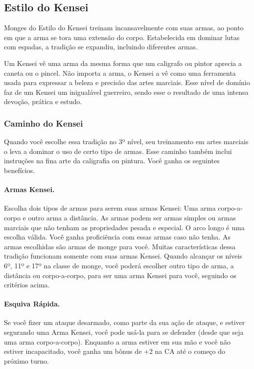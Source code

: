 \begin{multicols}{2}
\subsection*{Estilo do Kensei}%
\label{sub:estilo_do_kensei}

Monges do Estilo do Kensei treinam incansavelmente com suas armas, ao ponto em
que a arma se tora uma extensão do corpo. Estabelecida em dominar lutas com
espadas, a tradição se expandiu, incluindo diferentes armas.

Um Kensei vê uma arma da mesma forma que um caligrafo ou pintor aprecia a caneta
ou o pincel. Não importa a arma, o Kensei a vê como uma ferramenta usada para
expressar a beleza e precisão das artes marciais. Esse nível de domínio faz de
um Kensei um inigualável guerreiro, sendo esse o resultado de uma intensa
devoção, prática e estudo.

\subsubsection*{Caminho do Kensei}%
\label{ssub:caminho_do_kensei}

Quando você escolhe essa tradição no 3º nível, seu treinamento em artes marciais
o leva a dominar o uso de certo tipo de armas. Esse caminho também inclui
instruções na fina arte da caligrafia ou pintura. Você ganha os seguintes
benefícios.

\paragraph{Armas Kensei.}%
Escolha dois tipos de armas para serem suas armas Kensei: Uma arma corpo-a-corpo
e outro arma a distância. As armas podem ser armas simples ou armas marciais que
não tenham as propriedades pesada e especial. O arco longo é uma escolha válida.
Você ganha proficiência com essas armas caso não tenha. As armas escolhidas são
armas de monge para você. Muitas características dessa tradição funcionam
somente com suas armas Kensei. Quando alcançar os níveis 6º, 11º e 17º na
classe de monge, você poderá escolher outro tipo de arma, a distância ou
corpo-a-corpo, para ser uma arma Kensei para você, seguindo os critérios acima.

\paragraph{Esquiva Rápida.}%
Se você fizer um ataque desarmado, como parte da sua ação de ataque, e estiver
segurando uma Arma Kensei, você pode usá-la para se defender (desde que seja uma
arma corpo-a-corpo). Enquanto a arma estiver em sua mão e você não estiver
incapacitado, você ganha um bônus de +2 na CA até o começo do próximo turno.


\end{multicols}
